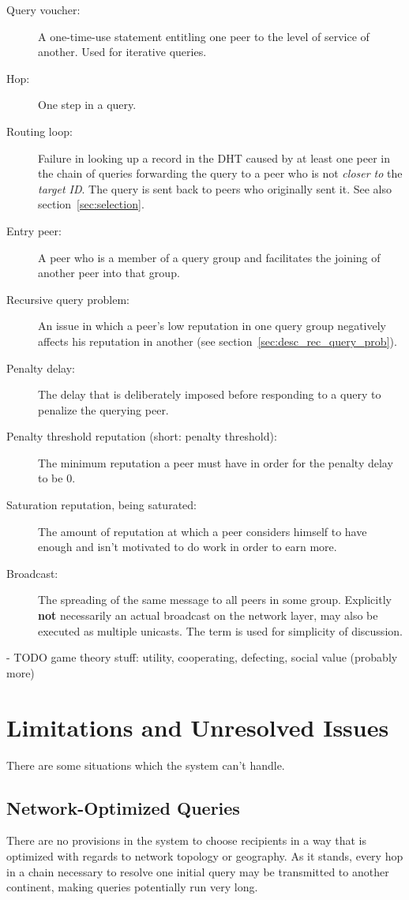 \begin{description}
\item[Query voucher:] A one-time-use statement entitling one peer to the level
of service of another. Used for iterative queries.
\item[Hop:] One step in a query.
\item[Routing loop:] Failure in looking up a record in the \ac{DHT} caused by at
least one peer in the chain of queries forwarding the query to a peer who is not
\emph{closer to} the \emph{target ID}. The query is sent back to peers who
originally sent it. See also section~\ref{sec:selection}.
\item[Entry peer:] A peer who is a member of a query group and facilitates the
joining of another peer into that group.
\item[Recursive query problem:] An issue in which a peer's low reputation in one
query group negatively affects his reputation in another (see
section~\ref{sec:desc_rec_query_prob}).
\item[Penalty delay:] The delay that is deliberately imposed before responding
to a query to penalize the querying peer.
\item[Penalty threshold reputation (short: penalty threshold):] The minimum
reputation a peer must have in order for the penalty delay to be 0.
\item[Saturation reputation, being saturated:] The amount of reputation at which
a peer considers himself to have enough and isn't motivated to do work in order
to earn more.
\item[Broadcast:] The spreading of the same message to all peers in some group.
Explicitly \textbf{not} necessarily an actual broadcast on the network layer,
may also be executed as multiple unicasts. The term is used for simplicity of
discussion.
\end{description}

- TODO game theory stuff: utility, cooperating, defecting, social value (probably
  more)

\section{Limitations and Unresolved Issues}
There are some situations which the system can't handle.

\subsection{Network-Optimized Queries}
There are no provisions in the system to choose recipients in a way that is
optimized with regards to network topology or geography. As it stands, every hop
in a chain necessary to resolve one initial query may be transmitted to another
continent, making queries potentially run very long.

